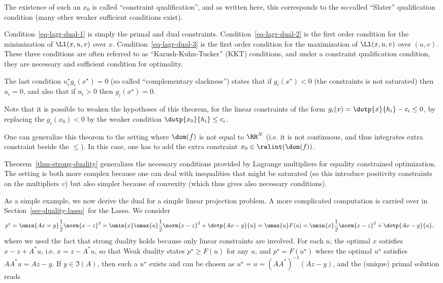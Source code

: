 The existence of such an $x_0$ is called ``constraint qualification'', and as written here, this corresponds to the so-called ``Slater'' qualification condition (many other weaker sufficient conditions exist). 

Condition~\eqref{eq-lagr-dual-1} is simply the primal and dual constraints. 
%
Condition~\eqref{eq-lagr-dual-2} is the first order condition for the minimization of $\Ll(x,u,v)$ over $x$.
%
Condition~\eqref{eq-lagr-dual-3} is the first order condition for the maximization of $\Ll(x,u,v)$ over $(u,v)$.
%
These three conditions are often referred to as ``Karush-Kuhn-Tucker'' (KKT) conditions, and under a constraint qualification condition, they are necessary and sufficient condition for optimality. 


The last condition $u_i^\star g_i(x^\star) = 0$ (so called ``complementary slackness'') states that if $g_i(x^\star)<0$ (the constraints is not saturated) then $u_i=0$, and also that if $u_i>0$ then $g_i(x^\star)=0$.

Note that it is possible to weaken the hypotheses of this theorem, for the linear constraints of the form $g_i(x) = \dotp{x}{h_i} - c_i \leq 0$, by replacing the $g_i(x_0)<0$ by the weaker condition $\dotp{x_0}{h_i} \leq c_i$.

One can generalize this theorem to the setting where $\dom(f)$ is not equal to $\RR^N$ (i.e. it is not continuous, and thus integrates extra constraint beside the $\leq$). In this case, one has to add the extra constraint $x_0 \in \relint(\dom(f))$.
	
Theorem~\ref{thm-strong-duality} generalizes the necessary conditions provided by Lagrange multipliers for equality constrained optimization. The setting is both more complex because one can deal with inequalities that might be saturated (so this introduce positivity constraints on the multipliers $v$) but also simpler because of convexity (which thus gives also necessary conditions).

As a simple example, we now derive the dual for a simple linear projection problem. A more complicated computation is carried over in Section~\ref{sec-duality-lasso} for the Lasso. We consider
\begin{align*}
	p^\star = \umin{Ax=y} \frac{1}{2}\norm{x-z}^2 &= \umin{x} \umax{u} \frac{1}{2}\norm{x-z}^2 + \dotp{Ax-y}{u}
	= \umax{u} F(u) = \umin{x} \frac{1}{2}\norm{x-z}^2 + \dotp{Ax-y}{u}, 
\end{align*}
where we used the fact that strong duality holds because only linear constraints are involved.
%
For each $u$, the optimal $x$ satisfies $x-z+A^*u$, i.e. $x=z-A^*u$, so that 
Weak duality states $p^\star \geq F(u)$ for any $u$, and $p^\star = F(u^\star)$ where the optimal $u^\star$ satisfies $AA^*u = Az-y$. If $y \in \Im(A)$, then such a $u^\star$ exists and can be chosen as $u^\star = u=(AA^*)^{-1} (Az -y)$, and the (unique) primal solution reads 


